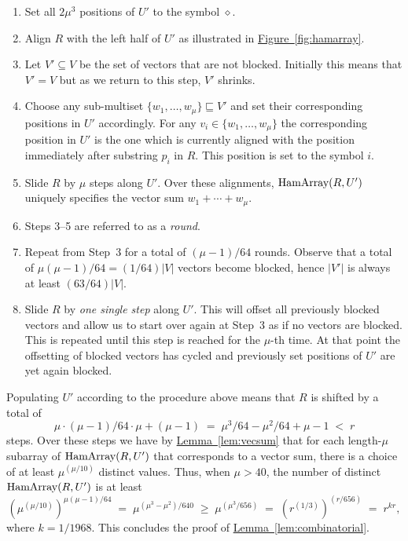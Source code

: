 \documentclass[11pt]{article}
\numberwithin{equation}{section}
\theoremstyle{definition}
\theoremstyle{plain}
\newcommand{\expref}[2]{\hyperref[#2]{#1~\ref{#2}}}
\newcommand{\Hamarray}{\ensuremath{\textup{HamArray}}}
\newcommand{\tsymb}{\ensuremath{\diamond}}
\begin{document}
\begin{enumerate} 
	\item Set all $2\mu^3$ positions of $U'$ to the symbol $\tsymb$.
	
	\item Align $R$ with the left half of $U'$ as illustrated in \expref{Figure}{fig:hamarray}.
	
	\item Let $V'\subseteq V$ be the set of vectors that are not blocked. Initially this means that $V'=V$ but as we return to this step, $V'$ shrinks.
	
	\item Choose any sub-multiset $\{w_1,\dots,w_\mu\} \sqsubseteq V'$ and set their corresponding positions in $U'$ accordingly. For any $v_i \in  \{w_1,\dots,w_\mu\} $ the corresponding position in $U'$ is the one which is currently aligned with the position immediately after substring $p_i$ in $R$.  This position is set to the symbol $i$.
	
	\item Slide $R$ by $\mu$ steps along $U'$. Over these alignments, $\Hamarray(R,U')$ uniquely specifies the vector sum $w_1+\cdots +w_\mu$.
	
	\item[~]   Steps 3--5 are referred to as a \emph{round}. 
	
	\item Repeat from Step~3 for a total of $(\mu-1)/64$ rounds. Observe that a total of $\mu(\mu-1)/64=(1/64)|V|$ vectors become blocked, hence $|V'|$ is always at least $(63/64)|V|$.
	
	\item Slide $R$ by \emph{one single step} along $U'$. This will offset all previously blocked vectors and allow us to start over again at Step~3 as if no vectors are blocked.
	This is repeated until this step is reached for the $\mu$-th time. At that point the offsetting of blocked vectors has cycled and previously set positions of $U'$ are yet again blocked.
\end{enumerate}

Populating $U'$ according to the procedure above means that $R$ is shifted by a total of
\[
\mu\cdot (\mu-1)/64 \cdot \mu + (\mu-1) \;=\; \mu^3/64 - \mu^2/64 +\mu-1 \;<\; r
\]
steps. Over these steps we have by \expref{Lemma}{lem:vecsum} that for each
%
length-$\mu$  %
subarray of $\Hamarray(R,U')$ that corresponds to a vector sum, there is a choice of at least $\mu^{(\mu/10)}$ distinct values.
Thus, when $\mu>40$, the number of distinct $\Hamarray(R,U')$ is at least
\[
\left(\mu^{(\mu/10)}\right)^{ \mu(\mu-1)/64 }
\;=\;
\mu^{(\mu^3-\mu^2)/640}
\;\geq\;
\mu^{(\mu^3/656)}
\;=\;
\left(r^{(1/3)}\right)^{(r/656)}
\;=\;
r^{kr},
\]
where $k=1/1968$.
This concludes the proof of \expref{Lemma}{lem:combinatorial}.
\end{document}
